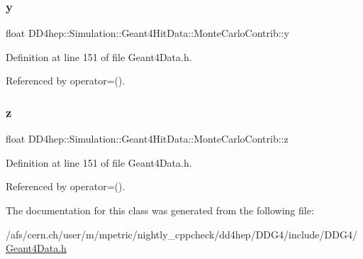 \subsubsection{\texorpdfstring{y}{y}}
{\footnotesize\ttfamily float D\+D4hep\+::\+Simulation\+::\+Geant4\+Hit\+Data\+::\+Monte\+Carlo\+Contrib\+::y}



Definition at line 151 of file Geant4\+Data.\+h.



Referenced by operator=().

\hypertarget{class_d_d4hep_1_1_simulation_1_1_geant4_hit_data_1_1_monte_carlo_contrib_ad56f9cc8b369b718c9f85a17bfe43054}{}\label{class_d_d4hep_1_1_simulation_1_1_geant4_hit_data_1_1_monte_carlo_contrib_ad56f9cc8b369b718c9f85a17bfe43054} 
\subsubsection{\texorpdfstring{z}{z}}
{\footnotesize\ttfamily float D\+D4hep\+::\+Simulation\+::\+Geant4\+Hit\+Data\+::\+Monte\+Carlo\+Contrib\+::z}



Definition at line 151 of file Geant4\+Data.\+h.



Referenced by operator=().



The documentation for this class was generated from the following file\+:\begin{DoxyCompactItemize}
\item 
/afs/cern.\+ch/user/m/mpetric/nightly\+\_\+cppcheck/dd4hep/\+D\+D\+G4/include/\+D\+D\+G4/\hyperlink{_geant4_data_8h}{Geant4\+Data.\+h}\end{DoxyCompactItemize}
